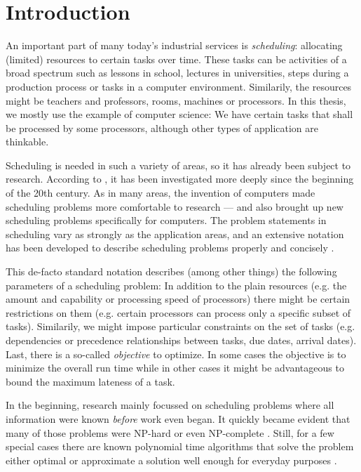 \chapter{Introduction}
\label{chap:introduction}

An important part of many today's industrial services is \emph{scheduling}: allocating (limited) resources to certain tasks over time. These tasks can be activities of a broad spectrum such as lessons in school, lectures in universities, steps during a production process or tasks in a computer environment. Similarily, the resources might be teachers and professors, rooms, machines or processors. In this thesis, we mostly use the example of computer science: We have certain tasks that shall be processed by some processors, although other types of application are thinkable.

Scheduling is needed in such a variety of areas, so it has already been subject to research. According to \cite{pinedo2008scheduling}, it has been investigated more deeply since the beginning of the 20th century. As in many areas, the invention of computers made scheduling problems more comfortable to research --- and also brought up new scheduling problems specifically for computers. The problem statements in scheduling vary as strongly as the application areas, and an extensive notation has been developed to describe scheduling problems properly and concisely \cite{schedulingclassification,pinedo2008scheduling}.

This de-facto standard notation describes (among other things) the following parameters of a scheduling problem: In addition to the plain resources (e.g. the amount and capability or processing speed of processors) there might be certain restrictions on them (e.g. certain processors can process only a specific subset of tasks). Similarily, we might impose particular constraints on the set of tasks (e.g. dependencies or precedence relationships between tasks, due dates, arrival dates). Last, there is a so-called \emph{objective} to optimize. In some cases the objective is to minimize the overall run time while in other cases it might be advantageous to bound the maximum lateness of a task.

In the beginning, research mainly focussed on scheduling problems where all information were known \emph{before} work even began. It quickly became evident that many of those problems were NP-hard or even NP-complete
\cite{Ullman:1975:NSP:1739944.1740138,
  computers-intractability,
  short-shop-schedules-np,
  flowshop-jobshop-garey-np}
.
Still, for a few special cases there are known polynomial time algorithms that solve the problem either optimal or approximate a solution well enough for everyday purposes \cite{pinedo2008scheduling}.

